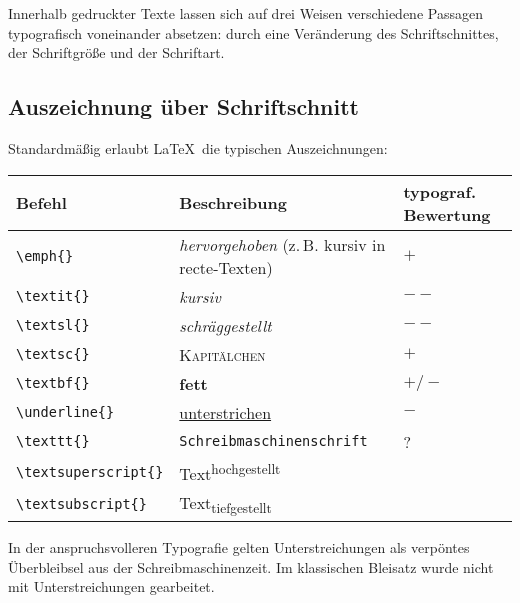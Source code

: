 
Innerhalb gedruckter Texte lassen sich auf drei Weisen verschiedene Passagen typografisch voneinander
absetzen:
durch eine Veränderung des Schriftschnittes,
der Schriftgröße und
der Schriftart.

\subsection{Auszeichnung über Schriftschnitt}

Standardmäßig erlaubt \LaTeX\ die typischen Auszeichnungen:

\begin{center}
\begin{tabular}{lll}
      Befehl                &       Beschreibung                        & typograf. Bewertung \\
      \hline
 \lstinline/\emph{}/        &   \emph{hervorgehoben} (z.\,B. kursiv in recte-Texten)        &   $+$ \\
 \lstinline/\textit{}/      &       \textsl{kursiv}                     &   $--$\\
 \lstinline/\textsl{}/      &       \textsl{schräggestellt}             &   $--$\\
 \lstinline/\textsc{}/      &       \textsc{Kapitälchen}                &   $+$ \\
 \lstinline/\textbf{}/      &       \textbf{fett}                       &   $+/-$ \\
 \lstinline/\underline{}/   &       \underline{unterstrichen}           &   $-$ \\
 \lstinline/\texttt{}/      &       \texttt{Schreibmaschinenschrift}    &   ? \\
 \lstinline/\textsuperscript{}/ &   Text\textsuperscript{hochgestellt}  &     \\
 \lstinline/\textsubscript{}/ &     Text\textsubscript{tiefgestellt}    &     \\
 \end{tabular} 
\end{center}


In der anspruchsvolleren Typografie gelten Unterstreichungen als verpöntes Überbleibsel
aus der Schreibmaschinenzeit. Im klassischen Bleisatz wurde nicht mit Unterstreichungen
gearbeitet.

